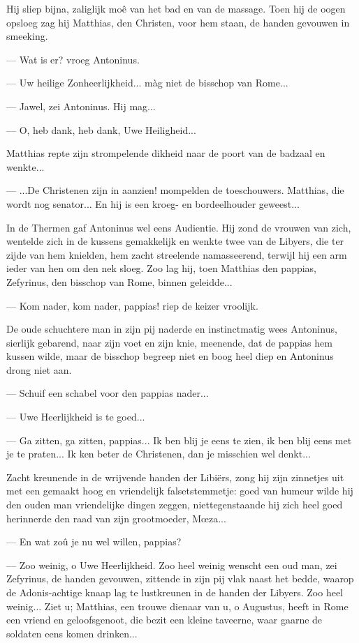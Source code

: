 \documentclass[a4paper, 12pt, oneside, dutch]{article}
\begin{document}
Hij sliep bijna, zaliglijk moê van het bad en van de massage. Toen hij de oogen opsloeg zag hij Matthias, den Christen, voor hem staan, de handen gevouwen in smeeking.

--- Wat is er? vroeg Antoninus.

--- Uw heilige Zonheerlijkheid... màg niet de bisschop van Rome...

--- Jawel, zei Antoninus. Hij mag...

--- O, heb dank, heb dank, Uwe Heiligheid...

Matthias repte zijn strompelende dikheid naar de poort van de badzaal en wenkte...

--- ...De Christenen zijn in aanzien! mompelden de toeschouwers. Matthias, die wordt nog senator... En hij is een kroeg- en bordeelhouder geweest...

In de Thermen gaf Antoninus wel eens Audientie. Hij zond de vrouwen van zich, wentelde zich in de kussens gemakkelijk en wenkte twee van de Libyers, die ter zijde van hem knielden, hem zacht streelende namasseerend, terwijl hij een arm ieder van hen om den nek sloeg. Zoo lag hij, toen Matthias den pappias, Zefyrinus, den bisschop van Rome, binnen geleidde...

--- Kom nader, kom nader, pappias! riep de keizer vroolijk.

De oude schuchtere man in zijn pij naderde en instinctmatig wees Antoninus, sierlijk gebarend, naar zijn voet en zijn knie, meenende, dat de pappias hem kussen wilde, maar de bisschop begreep niet en boog heel diep en Antoninus drong niet aan.

--- Schuif een schabel voor den pappias nader...

--- Uwe Heerlijkheid is te goed...

--- Ga zitten, ga zitten, pappias... Ik ben blij je eens te zien, ik ben blij eens met je te praten... Ik ken beter de Christenen, dan je misschien wel denkt...

Zacht kreunende in de wrijvende handen der Libiërs, zong hij zijn zinnetjes uit met een gemaakt hoog en vriendelijk falsetstemmetje: goed van humeur wilde hij den ouden man vriendelijke dingen zeggen, niettegenstaande hij zich heel goed herinnerde den raad van zijn grootmoeder, Mœza...

--- En wat zoû je nu wel willen, pappias?

--- Zoo weinig, o Uwe Heerlijkheid. Zoo heel weinig wenscht een oud man, zei Zefyrinus, de handen gevouwen, zittende in zijn pij vlak naast het bedde, waarop de Adonis-achtige knaap lag te lustkreunen in de handen der Libyers. Zoo heel weinig... Ziet u; Matthias, een trouwe dienaar van u, o Augustus, heeft in Rome een vriend en geloofsgenoot, die bezit een kleine taveerne, waar gaarne de soldaten eens komen drinken...
\end{document}
